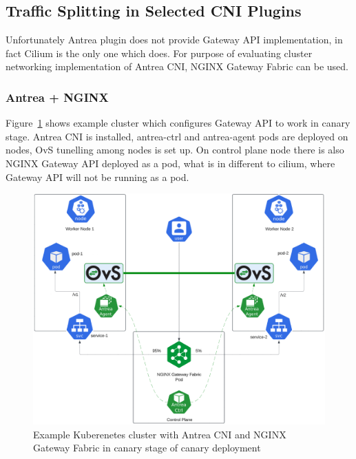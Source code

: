
\subsection{Traffic Splitting in Selected CNI Plugins}
\label{subsection:trafficSplitting}

Unfortunately Antrea plugin does not provide Gateway API implementation, in fact Cilium is the only one which does. For purpose of evaluating cluster networking implementation of Antrea CNI, NGINX Gateway Fabric can be used.



\subsubsection{Antrea + NGINX}
\label{subsection:antreaIngress}

Figure~\ref{fig:canaryAntreaImg} shows example cluster which configures Gateway API to work in canary stage. Antrea CNI is installed, antrea-ctrl and antrea-agent pods are deployed on nodes, OvS tunelling among nodes is set up. On control plane node there is also NGINX Gateway API deployed as a pod, what is in different to cilium, where Gateway API will not be running as a pod.

\begin{figure}[H]
    \centering
    \includegraphics[width=1\columnwidth]{images/antrea-nginx.png}
    \caption{Example Kuberenetes cluster with Antrea CNI and NGINX Gateway Fabric in canary stage of canary deployment}
    \label{fig:canaryAntreaImg}
\end{figure}

